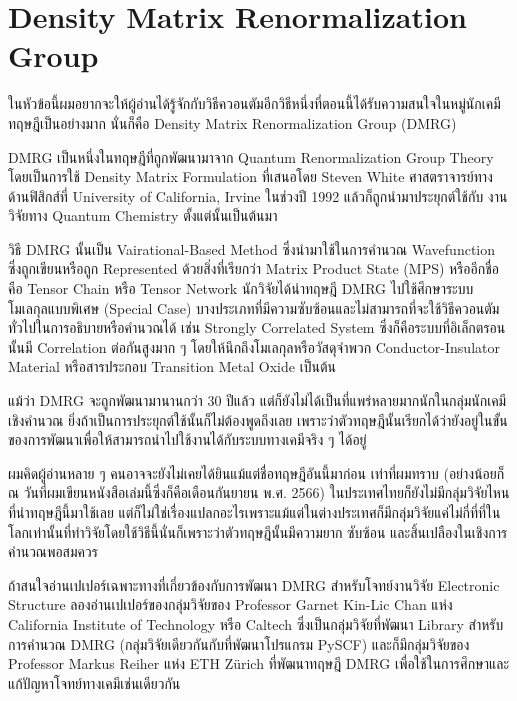 \section{Density Matrix Renormalization Group}

ในหัวข้อนี้ผมอยากจะให้ผู้อ่านได้รู้จักกับวิธีควอนตัมอีกวิธีหนึ่งที่ตอนนี้ได้รับความสนใจในหมู่นักเคมีทฤษฎีเป็นอย่างมาก นั่นก็คือ Density Matrix
Renormalization Group (DMRG)

DMRG เป็นหนึ่งในทฤษฎีที่ถูกพัฒนามาจาก Quantum Renormalization Group Theory โดยเป็นการใช้ Density Matrix Formulation
ที่เสนอโดย Steven White ศาสตราจารย์ทางด้านฟิสิกส์ที่ University of California, Irvine ในช่วงปี 1992 แล้วก็ถูกนำมาประยุกต์ใช้กับ%
งานวิจัยทาง Quantum Chemistry ตั้งแต่นั้นเป็นต้นมา

วิธี DMRG นั้นเป็น Vairational-Based Method ซึ่งนำมาใช้ในการคำนวณ Wavefunction ซึ่งถูกเขียนหรือถูก Represented ด้วยสิ่งที่เรียกว่า
Matrix Product State (MPS) หรืออีกชื่อคือ Tensor Chain หรือ Tensor Network นักวิจัยได้นำทฤษฎี DMRG ไปใช้ศึกษาระบบโมเลกุลแบบพิเศษ
(Special Case) บางประเภทที่มีความซับซ้อนและไม่สามารถที่จะใช้วิธีควอนตัมทั่วไปในการอธิบายหรือคำนวณได้ เช่น Strongly Correlated
System ซึ่งก็คือระบบที่อิเล็กตรอนนั้นมี Correlation ต่อกันสูงมาก ๆ โดยให้นึกถึงโมเลกุลหรือวัสดุจำพวก Conductor-Insulator Material
หรือสารประกอบ Transition Metal Oxide เป็นต้น

แม้ว่า DMRG จะถูกพัฒนามานานกว่า 30 ปีแล้ว แต่ก็ยังไม่ได้เป็นที่แพร่หลายมากนักในกลุ่มนักเคมีเชิงคำนวณ ยิ่งถ้าเป็นการประยุกต์ใช้นั้นก็ไม่ต้องพูดถึงเลย
เพราะว่าตัวทฤษฎีนั้นเรียกได้ว่ายังอยู่ในขั้นของการพัฒนาเพื่อให้สามารถนำไปใช้งานได้กับระบบทางเคมีจริง ๆ ได้อยู่

ผมคิดผู้อ่านหลาย ๆ คนอาจจะยังไม่เคยได้ยินแม้แต่ชื่อทฤษฎีอันนี้มาก่อน เท่าที่ผมทราบ (อย่างน้อยก็ ณ วันที่ผมเขียนหนังสือเล่มนี้ซึ่งก็คือเดือนกันยายน
พ.ศ. 2566) ในประเทศไทยก็ยังไม่มีกลุ่มวิจัยไหนที่นำทฤษฎีนี้มาใช้เลย แต่ก็ไม่ใช่เรื่องแปลกอะไรเพราะแม้แต่ในต่างประเทศก็มีกลุ่มวิจัยแค่ไม่กี่ที่ที่ใน%
โลกเท่านั้นที่ทำวิจัยโดยใช้วิธีนี้นั่นก็เพราะว่าตัวทฤษฎีนั้นมีความยาก ซับซ้อน และสิ้นเปลืองในเชิงการคำนวณพอสมควร

ถ้าสนใจอ่านเปเปอร์เฉพาะทางที่เกี่ยวข้องกับการพัฒนา DMRG สำหรับโจทย์งานวิจัย Electronic Structure ลองอ่านเปเปอร์ของกลุ่มวิจัยของ
Professor Garnet Kin-Lic Chan แห่ง California Institute of Technology หรือ Caltech ซึ่งเป็นกลุ่มวิจัยที่พัฒนา Library
สำหรับการคำนวณ DMRG (กลุ่มวิจัยเดียวกันกับที่พัฒนาโปรแกรม PySCF) และก็มีกลุ่มวิจัยของ Professor Markus Reiher แห่ง ETH Zürich
ที่พัฒนาทฤษฎี DMRG เพื่อใช้ในการศึกษาและแก้ปัญหาโจทย์ทางเคมีเช่นเดียวกัน

